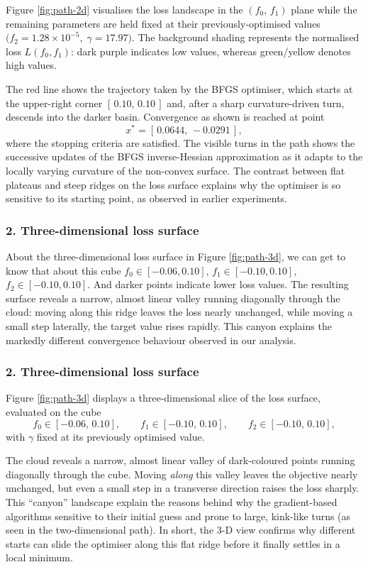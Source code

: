 \documentclass[12pt]{article}
\begin{document}
Figure \ref{fig:path-2d} visualises the loss landscape in the \((f_{0},\,f_{1})\) plane while the remaining parameters are held fixed at their previously‐optimised values \(\bigl(f_{2}=1.28\times10^{-5},\;\gamma=17.97\bigr)\).  
The background shading represents the normalised loss \(L(f_{0},f_{1})\): dark purple indicates low values, whereas green/yellow denotes high values.  

The red line shows the trajectory taken by the BFGS optimiser, which starts at the upper-right corner \([\,0.10,\,0.10\,]\) and, after a sharp curvature-driven turn, descends into the darker basin.  Convergence as shown is reached at point  
\[
x^{*} = [\,0.0644,\,-0.0291\,],
\]
where the stopping criteria are satisfied.  
The visible turns in the path shows the successive updates of the BFGS inverse-Hessian approximation as it adapts to the locally varying curvature of the non-convex surface.  
The contrast between flat plateaus and steep ridges on the loss surface explains why the optimiser is so sensitive to its starting point, as observed in earlier experiments.


\subsubsection*{2. Three-dimensional loss surface}
About the three-dimensional loss surface in Figure \ref{fig:path-3d}, we can get to know that about this cube $f_0\!\in[-0.06,0.10]$, $f_1\!\in[-0.10,0.10]$, $f_2\!\in[-0.10,0.10]$.  And darker points indicate lower loss values. The resulting surface reveals a narrow, almost linear valley running diagonally through the cloud: moving along this ridge leaves the loss nearly unchanged, while moving a small step laterally, the target value rises rapidly. This canyon explains the markedly different convergence behaviour observed in our analysis.

\subsubsection*{2. Three-dimensional loss surface}

Figure \ref{fig:path-3d} displays a three-dimensional slice of the loss surface, evaluated on the cube  
\[
f_{0}\in[-0.06,\,0.10],\qquad
f_{1}\in[-0.10,\,0.10],\qquad
f_{2}\in[-0.10,\,0.10],
\]
with \(\gamma\) fixed at its previously optimised value.

The cloud reveals a narrow, almost linear valley of dark-coloured points running diagonally through the cube.  
Moving \emph{along} this valley leaves the objective nearly unchanged, but even a small step in a transverse direction raises the loss sharply.  
This “canyon” landscape explain the reasons behind why the gradient-based algorithms sensitive to their initial guess and prone to large, kink-like turns (as seen in the two-dimensional path).  
In short, the 3-D view confirms why different starts can slide the optimiser along this flat ridge before it finally settles in a local minimum.
\end{document}
